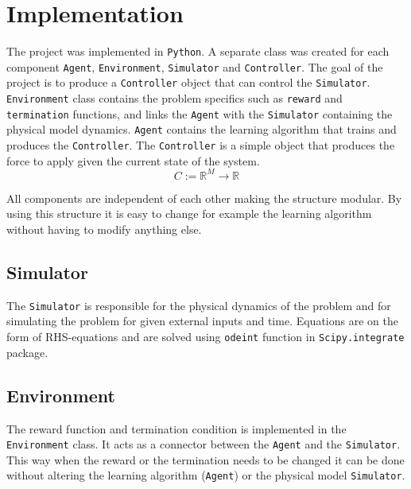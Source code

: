 \documentclass{LTHtwocol} %
\begin{document}
\section{Implementation}
The project was implemented in \texttt{Python}.
A separate class was created for each component \texttt{Agent}, \texttt{Environment}, \texttt{Simulator} and \texttt{Controller}.
The goal of the project is to produce a \texttt{Controller} object that can control the \texttt{Simulator}.
\texttt{Environment} class contains the problem specifics such as \texttt{reward} and \texttt{termination} functions, and links the \texttt{Agent} with the \texttt{Simulator} containing the physical model dynamics.
\texttt{Agent} contains the learning algorithm that trains and produces the \texttt{Controller}.
The \texttt{Controller} is a simple object that produces the force to apply given the current state of the system.
\begin{equation}
	C := \mathbb{R}^M \to \mathbb{R}
\end{equation}

All components are independent of each other making the structure modular.
By using this structure it is easy to change for example the learning algorithm without having to modify anything else.

\subsection{Simulator}
The \texttt{Simulator} is responsible for the physical dynamics of the problem and for simulating the problem for given external inputs and time.
Equations are on the form of RHS-equations and are solved using \texttt{odeint} function in \texttt{Scipy.integrate} package.

\subsection{Environment}
The reward function and termination condition is implemented in the \texttt{Environment} class.
It acts as a connector between the \texttt{Agent} and the \texttt{Simulator}.
This way when the reward or the termination needs to be changed it can be done without altering the learning algorithm (\texttt{Agent}) or the physical model \texttt{Simulator}.


\end{document}
